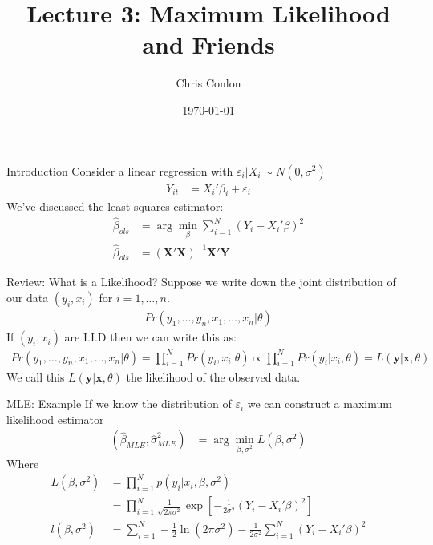 \documentclass[aspectratio=169]{beamer}
\title{Lecture 3: Maximum Likelihood and Friends}
\author{Chris Conlon }
\institute{NYU Stern }
\date{\today}
\begin{document}
\maketitle

\begin{frame}{Introduction}
Consider a linear regression with $\varepsilon_i | X_i \sim N(0,\sigma^2)$
\begin{align*}
Y_{it} &= X_{i}'\beta_i + \varepsilon_{i}
\end{align*}
We've discussed the \alert{least squares estimator}:
\begin{align*}
\widehat{\beta}_{ols} &= \arg \min_{\beta} \sum_{i=1}^N (Y_i - X_i' \beta)^2\\
\widehat{\beta}_{ols} &= (\mathbf{X}'\mathbf{X})^{-1} \mathbf{X}' \mathbf{Y}
\end{align*}
\end{frame}


\begin{frame}{Review: What is a Likelihood?}
Suppose we write down the joint distribution of our data $(y_i,x_i)$ for $i=1,\ldots,n$.
\begin{align*}
Pr(y_1,\ldots,y_n, x_1,\ldots,x_n | \theta)
\end{align*}
If  $(y_i,x_i)$ are I.I.D then we can write this as:
\begin{align*}
 Pr(y_1,\ldots,y_n, x_1,\ldots,x_n | \theta) = \prod_{i=1}^N Pr(y_i, x_i | \theta) \propto \prod_{i=1}^N Pr(y_i | x_i , \theta)=L( \mathbf{y}| \mathbf{x} ,\theta )
\end{align*}
We call this $L( \mathbf{y}| \mathbf{x} ,\theta )$ the \alert{likelihood} of the observed data.
\end{frame}




\begin{frame}{MLE: Example}
If we know the distribution of $\varepsilon_i$ we can construct a \alert{maximum likelihood estimator}
\begin{align*}
(\widehat{\beta}_{MLE},\widehat{\sigma}^2_{MLE}) &= \arg \min_{\beta,\sigma^2} L(\beta,\sigma^2)
\end{align*}
Where 
\begin{align*} 
L(\beta,\sigma^2) &= \prod_{i=1}^N p(y_i | x_i,\beta,\sigma^2) \\
                  &= \prod_{i=1}^N \frac{1}{\sqrt{2 \pi \sigma^2}} \exp \left[-\frac{1}{2\sigma^2}(Y_i - X_i' \beta)^2 \right]\\
l(\beta,\sigma^2) &= \sum_{i=1}^N -\frac{1}{2} \ln (2 \pi \sigma^2) - \frac{1}{2 \sigma^2} \sum_{i=1}^N(Y_i - X_i' \beta)^2
\end{align*}
\end{frame}
\end{document}
